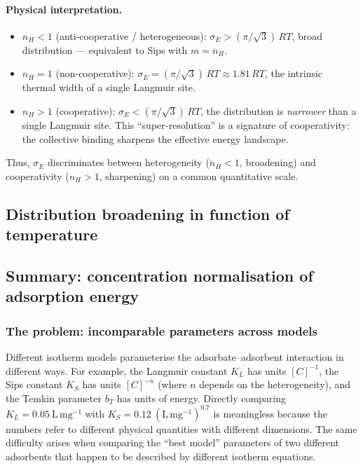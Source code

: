 \documentclass[12pt]{article}
\begin{document}
	\paragraph{Physical interpretation.}
	\begin{itemize}
		\item $n_H < 1$ (anti-cooperative / heterogeneous):
		$\sigma_E > (\pi/\sqrt{3})\,RT$, broad distribution ---
		equivalent to Sips with $m = n_H$.
		\item $n_H = 1$ (non-cooperative):
		$\sigma_E = (\pi/\sqrt{3})\,RT \approx 1.81\,RT$,
		the intrinsic thermal width of a single Langmuir site.
		\item $n_H > 1$ (cooperative):
		$\sigma_E < (\pi/\sqrt{3})\,RT$, the distribution is
		\emph{narrower} than a single Langmuir site.  This
		``super-resolution'' is a signature of cooperativity:
		the collective binding sharpens the effective energy
		landscape.
	\end{itemize}
	Thus, $\sigma_E$ discriminates between heterogeneity
	($n_H < 1$, broadening) and cooperativity ($n_H > 1$,
	sharpening) on a common quantitative scale.

	\subsection{Distribution broadening in function of temperature}

	\subsection{Summary: concentration normalisation of adsorption energy}

	\subsubsection{The problem: incomparable parameters across models}

	Different isotherm models parameterise the adsorbate--adsorbent
	interaction in different ways.  For example, the Langmuir constant
	$K_L$ has units $[C]^{-1}$, the Sips constant $K_S$ has units
	$[C]^{-n}$ (where $n$ depends on the heterogeneity), and the Temkin
	parameter $b_T$ has units of energy.
	Directly comparing $K_L = 0.05~\mathrm{L\,mg^{-1}}$ with
	$K_S = 0.12~\mathrm{(L\,mg^{-1})^{0.7}}$ is meaningless because
	the numbers refer to different physical quantities with different
	dimensions.  The same difficulty arises when comparing the ``best
	model'' parameters of two different adsorbents that happen to be
	described by different isotherm equations.
\end{document}
